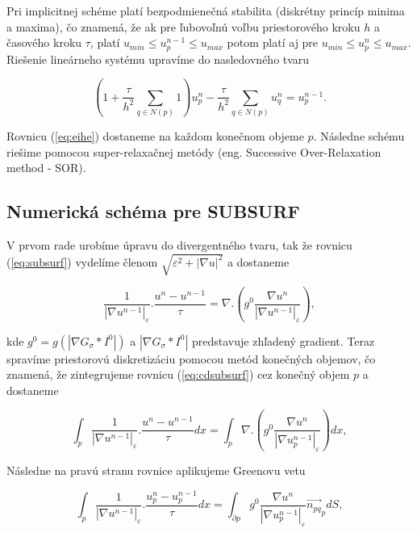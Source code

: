 \documentclass[a4paper,11pt,twoside]{article}%
\def\epsilon{\varepsilon}
\begin{document}
Pri implicitnej schéme platí bezpodmienečná stabilita (diskrétny princíp minima a maxima), čo znamená, že ak pre ľubovoľnú voľbu priestorového kroku $h$ a časového kroku $\tau$, platí $u_{min} \leq u_p^{n - 1} \leq u_{max}$ potom platí aj pre $u_{min} \leq u_p^{n} \leq u_{max}$. Riešenie lineárneho systému upravíme do nasledovného tvaru

\begin{equation} \label{eq:eihe}
(1 + \frac{\tau}{h^2} \sum_{q \in N(p)}1)u_p^n - \frac{\tau}{h^2} \sum_{q \in N(p)}u_q^n = u_p^{n - 1}.
\end{equation}

Rovnicu (\ref{eq:eihe}) dostaneme na každom konečnom objeme $p$. Následne schému riešime pomocou super-relaxačnej metódy (eng. Successive Over-Relaxation method - SOR). 

\subsection{Numerická schéma pre SUBSURF}

V prvom rade urobíme úpravu do divergentného tvaru, tak že rovnicu (\ref{eq:subsurf}) vydelíme členom $\sqrt{\epsilon^2 + |\nabla u|^2}$ a dostaneme

\begin{equation} \label{eq:cdsubsurf}
\frac{1}{|\nabla u^{n-1}|_{\epsilon}}.\frac{u^n-u^{n-1}}{\tau} = \nabla.(g^0\frac{\nabla u^n}{|\nabla u^{n-1}|_{\epsilon}}),
\end{equation}

kde $g^0 = g(|\nabla G_{\sigma}*I^0|)$ a $|\nabla G_{\sigma}*I^0|$ predstavuje zhľadený gradient. Teraz spravíme priestorovú diskretizáciu pomocou metód konečných objemov, čo znamená, že zintegrujeme rovnicu (\ref{eq:cdsubsurf}) cez konečný objem $p$ a dostaneme

\begin{equation}
\int_{p}\frac{1}{|\nabla u^{n-1}|_{\epsilon}}.\frac{u^n-u^{n-1}}{\tau}dx = \int_{p}\nabla.(g^0\frac{\nabla u^n}{|\nabla u_p^{n-1}|_{\epsilon}})dx,
\end{equation}

Následne na pravú stranu rovnice aplikujeme Greenovu vetu

\begin{equation} \label{greensubsurf}
\int_{p}\frac{1}{|\nabla u^{n-1}|_{\epsilon}}.\frac{u_p^n-u_p^{n-1}}{\tau}dx = \int_{\partial p} g^0\frac{\nabla u^n}{|\nabla u_p^{n-1}|_{\epsilon}}\vec{n_{pq}}_pdS,
\end{equation}
\end{document}
